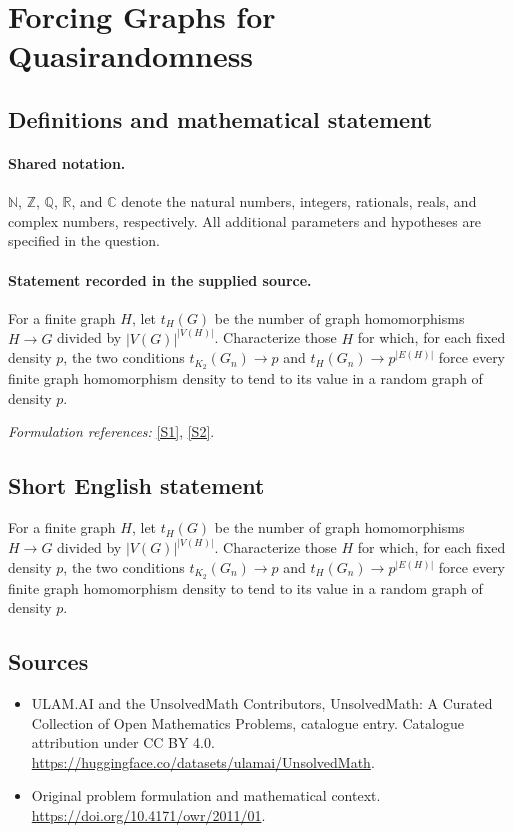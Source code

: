 \documentclass[11pt]{article}
\newcommand{\sref}[2]{\hyperlink{source:#1:#2}{[S#2]}}
\begin{document}
\section{Forcing Graphs for Quasirandomness}\label{statement}

\subsection{Definitions and mathematical statement}

\paragraph{Shared notation.}$\mathbb N$, $\mathbb Z$, $\mathbb Q$, $\mathbb R$, and $\mathbb C$ denote the natural numbers, integers, rationals, reals, and complex numbers, respectively. All additional parameters and hypotheses are specified in the question.


\paragraph{Statement recorded in the supplied source.}
For a finite graph $H$, let $t_H(G)$ be the number of graph homomorphisms $H\to G$ divided by $|V(G)|^{|V(H)|}$. Characterize those $H$ for which, for each fixed density $p$, the two conditions $t_{K_2}(G_n)\to p$ and $t_H(G_n)\to p^{|E(H)|}$ force every finite graph homomorphism density to tend to its value in a random graph of density $p$.
\par\smallskip\textit{Formulation references:} \sref{statement}{1}, \sref{statement}{2}.
\subsection{Short English statement}
For a finite graph $H$, let $t_H(G)$ be the number of graph homomorphisms $H\to G$ divided by $|V(G)|^{|V(H)|}$. Characterize those $H$ for which, for each fixed density $p$, the two conditions $t_{K_2}(G_n)\to p$ and $t_H(G_n)\to p^{|E(H)|}$ force every finite graph homomorphism density to tend to its value in a random graph of density $p$.
\subsection{Sources}
\begin{itemize}
\item[\hypertarget{source:statement:1}{S1}] ULAM.AI and the UnsolvedMath Contributors, UnsolvedMath: A Curated Collection of Open Mathematics Problems, catalogue entry. Catalogue attribution under CC BY 4.0.
\url{https://huggingface.co/datasets/ulamai/UnsolvedMath}.
\item[\hypertarget{source:statement:2}{S2}] Original problem formulation and mathematical context.
\url{https://doi.org/10.4171/owr/2011/01}.
\end{itemize}
\label{end:statement}
\end{document}
